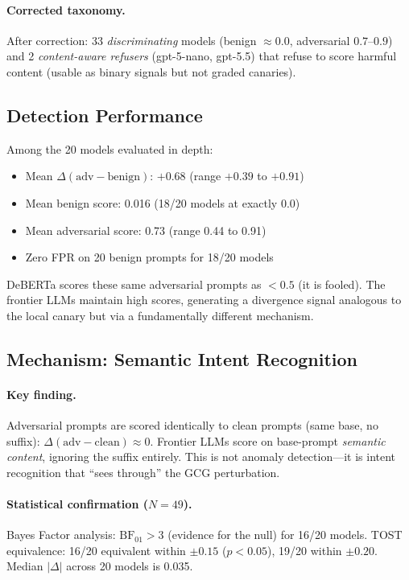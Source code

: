 \documentclass{article}
\begin{document}
\paragraph{Corrected taxonomy.} After correction: 33 \emph{discriminating} models (benign $\approx 0.0$, adversarial $0.7$--$0.9$) and 2 \emph{content-aware refusers} (gpt-5-nano, gpt-5.5) that refuse to score harmful content (usable as binary signals but not graded canaries).

\subsection{Detection Performance}
\label{sec:frontier-detection}

Among the 20 models evaluated in depth:
\begin{itemize}
\item Mean $\Delta(\text{adv} - \text{benign})$: $+0.68$ (range $+0.39$ to $+0.91$)
\item Mean benign score: 0.016 (18/20 models at exactly 0.0)
\item Mean adversarial score: 0.73 (range 0.44 to 0.91)
\item Zero FPR on 20 benign prompts for 18/20 models
\end{itemize}

DeBERTa scores these same adversarial prompts as $< 0.5$ (it is fooled). The frontier LLMs maintain high scores, generating a divergence signal analogous to the local canary but via a fundamentally different mechanism.

\subsection{Mechanism: Semantic Intent Recognition}
\label{sec:semantic-mechanism}

\paragraph{Key finding.} Adversarial prompts are scored identically to clean prompts (same base, no suffix): $\Delta(\text{adv} - \text{clean}) \approx 0$. Frontier LLMs score on base-prompt \emph{semantic content}, ignoring the suffix entirely. This is not anomaly detection---it is intent recognition that ``sees through'' the GCG perturbation.

\paragraph{Statistical confirmation ($N{=}49$).} Bayes Factor analysis: $\text{BF}_{01} > 3$ (evidence for the null) for 16/20 models. TOST equivalence: 16/20 equivalent within $\pm 0.15$ ($p < 0.05$), 19/20 within $\pm 0.20$. Median $|\Delta|$ across 20 models is 0.035.
\end{document}
